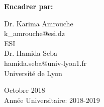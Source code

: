 \begin{titlepage}
\begin{center}
\begin{multicols}{2}
	\end{multicols} 
	
	\vskip 0.2in

	 \textbf{Encadrer par:}\\
	 
	 \begin{multicols}{2}
			\Large 	Dr. Karima Amrouche\\
			\large k\_amrouche@esi.dz\\
			ESI\\
		\columnbreak
 			\Large Dr. Hamida Seba\\
			\large hamida.seba@univ-lyon1.fr\\
			Université de Lyon \\
	\end{multicols}
	
	
	\small
	\vskip 0.5in
	Octobre 2018 \\
	Année Universitaire: 2018-2019\\
	
	\end{center}		
\restoregeometry
\end{titlepage}